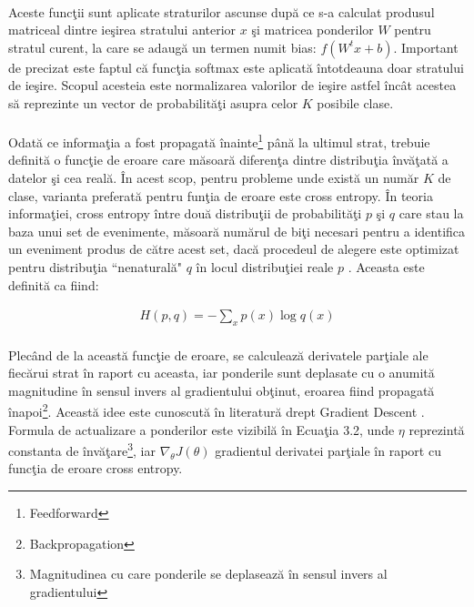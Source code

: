 \paragraph{}
Aceste func\c tii sunt aplicate straturilor ascunse dup\u a ce s-a calculat produsul matriceal dintre ie\c sirea stratului anterior \(x\) \c si matricea ponderilor \(W\) pentru stratul curent, la care se adaug\u a un termen numit bias: \(f(W^tx+b)\). Important de precizat este faptul c\u a func\c tia softmax este aplicat\u a \^ intotdeauna doar stratului de ie\c sire. Scopul acesteia este normalizarea valorilor de ie\c sire astfel \^ inc\^ at acestea s\u a reprezinte un vector de probabilit\u a\c ti asupra celor \(K\) posibile clase.

\paragraph{}
Odat\u a ce informa\c tia a fost propagat\u a \^ inainte\footnote{Feedforward} p\^ an\u a la ultimul strat, trebuie definit\u a o func\c tie de eroare care m\u asoar\u a diferen\c ta dintre distribu\c tia \^ inv\u a\c tat\u a a datelor \c si cea real\u a. \^ In acest scop, pentru probleme unde exist\u a un num\u ar \(K\) de clase, varianta preferat\u a pentru fun\c tia de eroare este cross entropy. \^ In teoria informa\c tiei, cross entropy \^ intre dou\u a distribu\c tii de probabilit\u a\c ti \(p\) \c si \(q\) care stau la baza unui set de evenimente, m\u asoar\u a num\u arul de bi\c ti necesari pentru a identifica un eveniment produs de c\u atre acest set, dac\u a procedeul de alegere este optimizat pentru distribu\c tia ``nenatural\u a" \(q\) \^ in locul distribu\c tiei reale \(p\) \cite{Goodfellow-et-al-2016}. Aceasta este definit\u a ca fiind:

\begin{equation}
\begin{split}
H(p,q)=-\sum_{x}p(x)\log q(x)
\end{split}
\end{equation}

\paragraph{}
Plec\^ and de la aceast\u a func\c tie de eroare, se calculeaz\u a derivatele par\c tiale ale fiec\u arui strat \^ in raport cu aceasta, iar ponderile sunt deplasate cu o anumit\u a magnitudine \^ in sensul invers al gradientului ob\c tinut, eroarea fiind propagat\u a \^ inapoi\footnote{Backpropagation}. Aceast\u a idee este cunoscut\u a \^ in literatur\u a drept Gradient Descent \cite{Bazaraa:2013:NPT:2553227}. Formula de actualizare a ponderilor este vizibil\u a \^ in Ecua\c tia 3.2, unde \(\eta\) reprezint\u a constanta de \^ inv\u a\c tare\footnote{Magnitudinea cu care ponderile se deplaseaz\u a \^ in sensul invers al gradientului}, iar \(\nabla_{\theta}J(\theta)\) gradientul derivatei par\c tiale \^ in raport cu func\c tia de eroare cross entropy.

